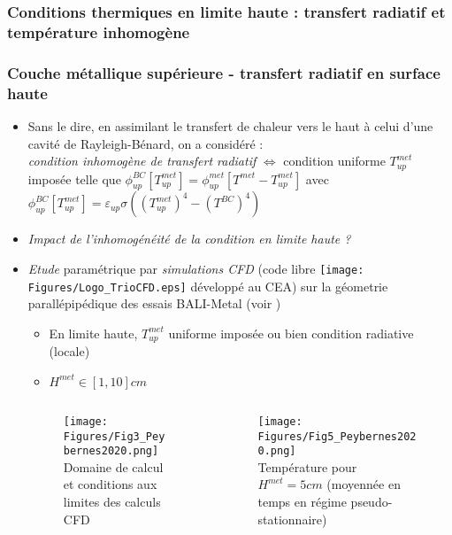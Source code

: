 \subsubsection{Conditions thermiques en limite haute : transfert radiatif et température inhomogène}
\begin{frame}[fragile]
\frametitle{Couche métallique supérieure - transfert radiatif en surface haute}
\begin{itemize}
\item Sans le dire, en assimilant le transfert de chaleur vers le haut à celui d'une cavité de Rayleigh-Bénard, on a considéré : \\
\emph{condition inhomogène de transfert radiatif} $\Leftrightarrow$ condition uniforme $T_{up}^{met}$ imposée telle que $\phi_{up}^{BC}\left[T_{up}^{met}\right] = \phi_{up}^{met}\left[T^{met}-T_{up}^{met}\right]$ avec $\phi^{BC}_{up}\left[T^{met}_{up}\right]=\varepsilon_{up}\sigma\left(\left(T^{met}_{up}\right)^4-\left(T^{BC}\right)^4\right)$
\item \emph{Impact de l'inhomogénéité de la condition en limite haute ?}
\item \emph{Etude} paramétrique par \emph{simulations CFD} (code libre \texttt{[image: Figures/Logo\_TrioCFD.eps]} développé au CEA) sur la géometrie parallépipédique des essais BALI-Metal (voir \cite{Peybernes2020})
\begin{itemize}
\item En limite haute, $T_{up}^{met}$ uniforme imposée ou bien condition radiative (locale)
\item $H^{met} \in [1, 10]cm$
\end{itemize}
\begin{columns}[T]
    \begin{column}{0.7\textwidth}
\begin{figure}[H]
\centering \texttt{[image: Figures/Fig3\_Peybernes2020.png]} \\
{\tiny Domaine de calcul et conditions aux limites des calculs CFD}
\end{figure}
    \end{column}
    \begin{column}{0.3\textwidth}
\begin{figure}[H]
\centering \texttt{[image: Figures/Fig5\_Peybernes2020.png]} \\
{\tiny Température pour $H^{met}=5cm$ (moyennée en temps en régime pseudo-stationnaire)}
\end{figure}
    \end{column}
    \end{columns}
\end{itemize}
\end{frame}
